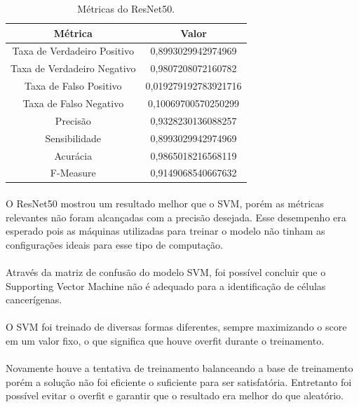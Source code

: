 \documentclass[12pt]{article}
\begin{document}
\begin{table}[]
    \centering
    \begin{tabular}{|c|c|}
        \hline
         Métrica & Valor\\
         \hline
         Taxa de Verdadeiro Positivo & 0,8993029942974969\\
         \hline
         Taxa de Verdadeiro Negativo & 0,9807208072160782\\
         \hline
         Taxa de Falso Positivo & 0,019279192783921716\\
         \hline
         Taxa de Falso Negativo & 0,10069700570250299\\
         \hline
         Precisão & 0,9328230136088257\\
         \hline
         Sensibilidade & 0,8993029942974969\\
         \hline
         Acurácia & 0,9865018216568119\\
         \hline
         F-Measure & 0,9149068540667632\\
         \hline
    \end{tabular}
    \caption{Métricas do ResNet50.}
    \label{tab:metricas-resnet50}
\end{table}

\paragraph{}O ResNet50 mostrou um resultado melhor que o SVM, porém as métricas relevantes não foram alcançadas com a precisão desejada. Esse desempenho era esperado pois as máquinas utilizadas para treinar o modelo não tinham as configurações ideais para esse tipo de computação.

\paragraph{}Através da matriz de confusão do modelo SVM, foi possível concluir que o Supporting Vector Machine não é adequado para a identificação de células cancerígenas.

\paragraph{}O SVM foi treinado de diversas formas diferentes, sempre maximizando o score em um valor fixo, o que significa que houve overfit durante o treinamento.

\paragraph{}Novamente houve a tentativa de treinamento balanceando a base de treinamento porém a solução não foi eficiente o suficiente para ser satisfatória.
Entretanto foi possível evitar o overfit e garantir que o resultado era melhor do que aleatório.
\end{document}
